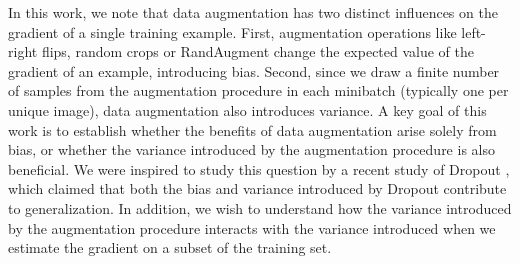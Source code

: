 \documentclass{article}
\begin{document}
In this work, we note that data augmentation has two distinct influences on the gradient of a single training example. First, augmentation operations like left-right flips, random crops or RandAugment \citep{cubuk2020randaugment} change the expected value of the gradient of an example, introducing bias. Second, since we draw a finite number of samples from the augmentation procedure in each minibatch (typically one per unique image), data augmentation also introduces variance. A key goal of this work is  to establish whether the benefits of data augmentation arise solely from bias, or whether the variance introduced by the augmentation procedure is also beneficial. We were inspired to study this question by a recent study of Dropout \citep{wei2020implicit}, which claimed that both the bias and variance introduced by Dropout contribute to generalization. In addition, we wish to understand how the variance introduced by the augmentation procedure interacts with the variance introduced when we estimate the gradient on a subset of the training set.
\end{document}
